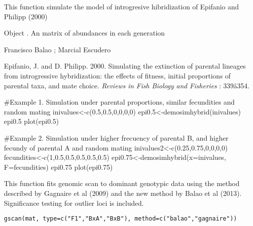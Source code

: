 \documentclass[letterpaper]{book}
\begin{document}
%
\begin{Details}\relax
This function simulate the model of introgresive hibridization of Epifanio and Philipp (2000)
\end{Details}
%
\begin{Value}
Object . An matrix of abundances in each generation
\end{Value}
%
\begin{Author}\relax
Francisco Balao ;
Marcial Escudero
\end{Author}
%
\begin{References}\relax
Epifanio, J. and D. Philipp. 2000. Simulating the extinction of parental lineages from introgressive hybridization: the effects of fitness, initial proportions of parental taxa, and mate choice. \emph{Reviews in Fish Biology and Fisheries} : 339â354. 
\end{References}
%
\begin{SeeAlso}\relax
{}

\end{SeeAlso}
%
\begin{Examples}
\begin{ExampleCode}

#Example 1. Simulation under parental proportions, similar fecundities and random mating 
inivalues<-c(0.5,0.5,0,0,0,0)
epi0.5<-demosimhybrid(inivalues)
epi0.5
plot(epi0.5)

#Example 2. Simulation under higher frecuency of parental B, and higher fecundy of parental A and random mating
inivalues2<-c(0.25,0.75,0,0,0,0)
fecundities<-c(1,0.5,0.5,0.5,0.5,0.5)
epi0.75<-demosimhybrid(x=inivalues, F=fecundities)
epi0.75
plot(epi0.75)
\end{ExampleCode}
\end{Examples}
%
\begin{Description}\relax
This function fits genomic scan to dominant genotypic data using the method described by Gagnaire et al (2009) and the new method by Balao et al (2013). Significance testing for outlier loci is included.
\end{Description}
%
\begin{Usage}
\begin{verbatim}
gscan(mat, type=c("F1","BxA","BxB"), method=c("balao","gagnaire"))

\end{verbatim}
\end{Usage}
\end{document}
